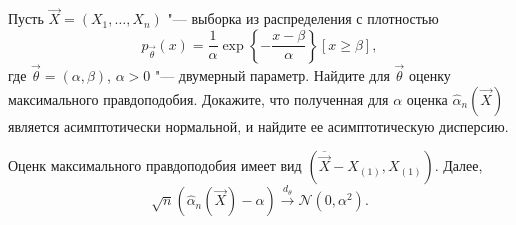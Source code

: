 \begin{problem}
    Пусть $\vec{X} = (X_{1}, \ldots, X_{n})$ "--- выборка из распределения с плотностью
    \[
        p_{\vec{\theta}}(x) = \frac{1}{\alpha}\exp\left\{-\frac{x - \beta}{\alpha}\right\}[x \geq \beta],
    \]
    где $\vec{\theta} = (\alpha, \beta)$, $\alpha > 0$ "--- двумерный параметр. Найдите для $\vec{\theta}$ оценку максимального правдоподобия. Докажите, что полученная для $\alpha$ оценка $\hat{\alpha}_{n}(\vec{X})$ является асимптотически нормальной, и найдите ее асимптотическую дисперсию.
\end{problem}
\begin{answer}
    Оценк максимального правдоподобия имеет вид $(\overline{\vec{X}} - X_{(1)}, X_{(1)})$. Далее,
    \[
        \sqrt{n}(\hat{\alpha}_{n}(\vec{X}) - \alpha) \xrightarrow{d_{\theta}} \mathcal{N}(0, \alpha^{2}).
    \]
\end{answer}